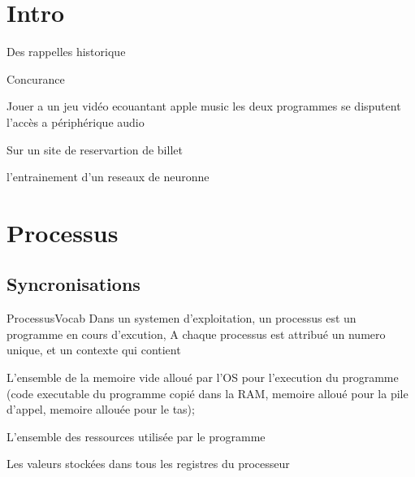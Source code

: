 \documentclass[a4paper,french,bookmarks]{article}
\begin{document}
    \renewcommand{\thesection}{\Roman{section}} 
    \renewcommand{\thesubsection}{\thesection.\Alph{subsection}}
    \renewcommand{\labelenumi}{\thesection.\arabic{enumi}.}
    \renewcommand*{\labelenumii}{\alph{enumii}.}
    \renewcommand*{\labelenumiii}{\alph{enumiii}.}
    
    \def\authorvar{DRISSI Rayan}
    \section{Intro}
    
    Des rappelles historique 
    
    \begin{example}{Concurance}{}
        \begin{enumerate}
            \itt Jouer a un jeu vidéo ecouantant apple music les deux programmes se disputent l'accès a périphérique audio 
            
            \itt Sur un site de reservartion de billet
            
            \itt l'entrainement d'un reseaux de neuronne 
        
        \end{enumerate}
        
        
    \end{example}
    
    \section{Processus}
    
    \subsection{Syncronisations}
    
    
    \begin{definition}{Processus}{Vocab}
        Dans un systemen d'exploitation, un processus est un programme en cours d'excution, A chaque processus est attribué un numero unique, et un contexte qui contient
        \begin{enumerate}
            \itast L'ensemble de la memoire vide alloué par l'OS pour l'execution du programme (code executable du programme copié dans la RAM, memoire alloué pour la pile d'appel, memoire allouée pour le tas);
            
            \itast L'ensemble des ressources utilisée par le programme
            
            \itast Les valeurs stockées dans tous les registres du processeur 
        \end{enumerate}
        
    \end{definition}
        
\end{document}
